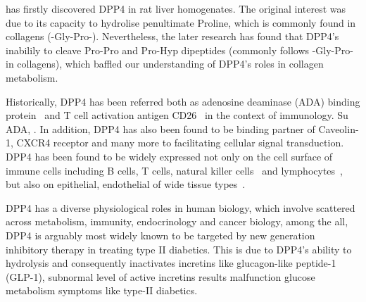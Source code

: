 \citet{Hopsu-Havu1966} has firstly discovered DPP4 in rat liver homogenates. The original interest was due to its capacity to hydrolise penultimate Proline, which is commonly found in collagens (-Gly-Pro-). Nevertheless, the later research has found that DPP4's inabilily to cleave Pro-Pro and Pro-Hyp dipeptides (commonly follows -Gly-Pro- in collagens), which baffled our understanding of DPP4's roles in collagen metabolism.
\par
Historically, DPP4 has been referred both as adenosine deaminase (ADA) binding protein~\cite{Kameoka_1993} and T cell activation antigen CD26~\cite{Fleischer_1994} in the context of immunology. Su ADA, . In addition, DPP4 has also been found to be binding partner of Caveolin-1, CXCR4 receptor and many more to facilitating cellular signal transduction.  DPP4 has been found to be widely expressed not only on the cell surface of immune cells including B cells, T cells, natural killer cells~\cite{Fleischer1987,Fleischer1988,Gorrell1991,Capuani2018,Bühling1994,Bühling1995} and lymphocytes~\cite{Gorvel1991}, but also on epithelial, endothelial of wide tissue types~\cite{Gorrell2001}.
\par 
DPP4 has a diverse physiological roles in human biology, which involve scattered across metabolism, immunity, endocrinology and cancer biology, among the all, DPP4 is arguably most widely known to be targeted by new generation inhibitory therapy in treating type II diabetics. This is due to DPP4's ability to hydrolysis and consequently inactivates incretins like glucagon-like peptide-1 (GLP-1), subnormal level of active incretins results malfunction glucose metabolism symptoms like type-II diabetics. 
\par 
